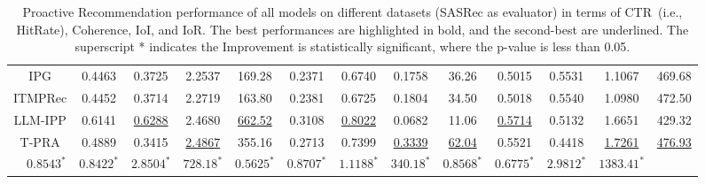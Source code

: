 \documentclass{llmxive}
\begin{document}
\begin{table}[t]
{\begin{tabular}{c c cccc cccc cccc}
            \multicolumn{2}{c}{IPG}
            & 0.4463 & 0.3725 & 2.2537 & 169.28 & 0.2371 & 0.6740 
            & 0.1758 & 36.26 & 0.5015 & 0.5531 & 1.1067 & 469.68 \\
            \multicolumn{2}{c}{ITMPRec}
            & 0.4452 & 0.3714 & 2.2719 & 163.80 & 0.2381 & 0.6725 
            & 0.1804 & 34.50 & 0.5018 & 0.5540 & 1.0980 & 472.50 \\
            \multicolumn{2}{c}{LLM-IPP}
            & 0.6141 & \underline{0.6288} & 2.4680 & \underline{662.52} & 0.3108 & \underline{0.8022}
            & 0.0682 & 11.06 & \underline{0.5714} & 0.5132 & 1.6651 & 429.32 \\
            \multicolumn{2}{c}{T-PRA}
            & 0.4889 & 0.3415 & \underline{2.4867} & 355.16 & 0.2713 & 0.7399
            & \underline{0.3339} & \underline{62.04} & 0.5521 & 0.4418 & \underline{1.7261} & \underline{476.93} \\
        \hline
        \midrule   
            \rowcolor{tableours}
            \multicolumn{2}{c}{\textbf{ProRL (Ours)}}
            & $\mathbf{0.8543}^{*}$ & $\mathbf{0.8422}^{*}$ & $\mathbf{2.8504}^{*}$ & $\mathbf{728.18}^{*}$ & $\mathbf{0.5625}^{*}$ & $\mathbf{0.8707}^{*}$  & 
            $\mathbf{1.1188}^{*}$ & $\mathbf{340.18}^{*}$ & $\mathbf{0.8568}^{*}$ & $\mathbf{0.6775}^{*}$ & $\mathbf{2.9812}^{*}$ & $\mathbf{1383.41}^{*}$ \\
        
      \bottomrule[1.5pt]
      \end{tabular}
      }
\caption{Proactive Recommendation performance of all models on different datasets (SASRec as evaluator) in terms of CTR~(i.e., HitRate), Coherence, IoI, and IoR. The best performances are highlighted in bold, and the second-best are underlined. The superscript * indicates the Improvement is statistically significant, where the p-value is less than 0.05.}
\label{tab:overall comparison}
\end{table}%
\end{document}
